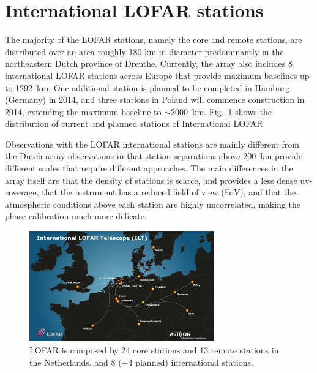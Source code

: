 \documentclass[graybox]{svmult}
\begin{document}

\section{International LOFAR stations}
The majority of the LOFAR stations, namely the core and remote stations, are
distributed over an area roughly 180 km in diameter predominantly in the
northeastern Dutch province of Drenthe. Currently, the array also includes 8
international LOFAR stations across Europe that provide maximum baselines up to
1292~km. One additional station is planned to be completed in Hamburg (Germany)
in 2014, and three stations in Poland will commence construction in 2014,
extending the maximum baseline to $\sim$2000~km. Fig.~\ref{fig:stations} shows
the distribution of current and planned stations of International LOFAR.

Observations with the LOFAR international stations are mainly different from
the Dutch array observations in that station separations above 200~km provide
different scales that require different approaches. The main differences in the
array itself are that the density of stations is scarce, and provides a less
dense uv-coverage, that the instrument has a reduced field of view (FoV),
and that the atmospheric conditions above each station are highly uncorrelated,
making the phase calibration much more delicate. 


\begin{figure}[t]
\begin{center}
\includegraphics[width=8cm]{figures/LOFAR_stations_map.jpg}
\caption{LOFAR is composed by 24 core stations and 13 remote stations in the
Netherlands, and 8 (+4 planned) international stations.}
\label{fig:stations}
\end{center}
\end{figure}
\end{document}
